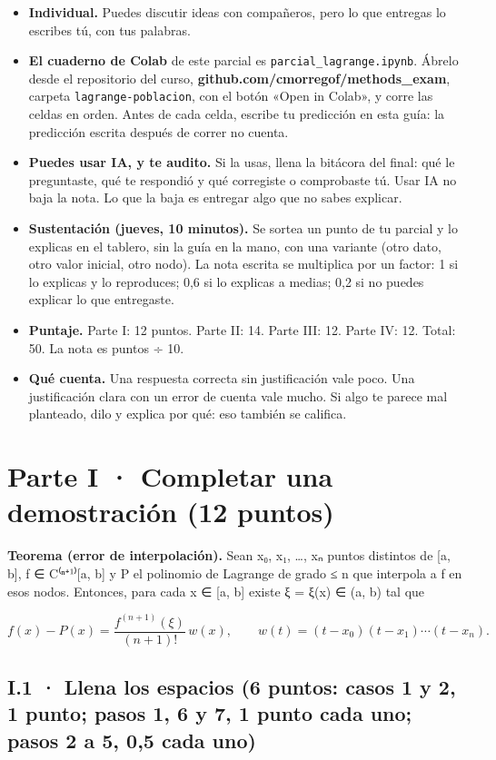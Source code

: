 \begin{itemize}
\tightlist
\item
  \textbf{Individual.} Puedes discutir ideas con compañeros, pero lo que entregas lo escribes tú, con tus palabras.
\item
  \textbf{El cuaderno de Colab} de este parcial es \texttt{parcial\_lagrange.ipynb}. Ábrelo desde el repositorio del curso, \textbf{github.com/cmorregof/methods\_exam}, carpeta \texttt{lagrange-poblacion}, con el botón «Open in Colab», y corre las celdas en orden. Antes de cada celda, escribe tu predicción en esta guía: la predicción escrita después de correr no cuenta.
\item
  \textbf{Puedes usar IA, y te audito.} Si la usas, llena la bitácora del final: qué le preguntaste, qué te respondió y qué corregiste o comprobaste tú. Usar IA no baja la nota. Lo que la baja es entregar algo que no sabes explicar.
\item
  \textbf{Sustentación (jueves, 10 minutos).} Se sortea un punto de tu parcial y lo explicas en el tablero, sin la guía en la mano, con una variante (otro dato, otro valor inicial, otro nodo). La nota escrita se multiplica por un factor: 1 si lo explicas y lo reproduces; 0,6 si lo explicas a medias; 0,2 si no puedes explicar lo que entregaste.
\item
  \textbf{Puntaje.} Parte I: 12 puntos. Parte II: 14. Parte III: 12. Parte IV: 12. Total: 50. La nota es puntos ÷ 10.
\item
  \textbf{Qué cuenta.} Una respuesta correcta sin justificación vale poco. Una justificación clara con un error de cuenta vale mucho. Si algo te parece mal planteado, dilo y explica por qué: eso también se califica.
\end{itemize}

\section{Parte I · Completar una demostración (12 puntos)}

\textbf{Teorema (error de interpolación).} Sean x₀, x₁, \ldots, xₙ puntos distintos de {[}a, b{]}, f ∈ C⁽ⁿ⁺¹⁾{[}a, b{]} y P el polinomio de Lagrange de grado ≤ n que interpola a f en esos nodos. Entonces, para cada x ∈ {[}a, b{]} existe ξ = ξ(x) ∈ (a, b) tal que

\[f(x) - P(x) = \frac{f^{(n+1)}(\xi)}{(n+1)!}\, w(x), \qquad w(t) = (t - x_0)(t - x_1)\cdots(t - x_n).\]

\subsection{I.1 · Llena los espacios (6 puntos: casos 1 y 2, 1 punto; pasos 1, 6 y 7, 1 punto cada uno; pasos 2 a 5, 0,5 cada uno)}

